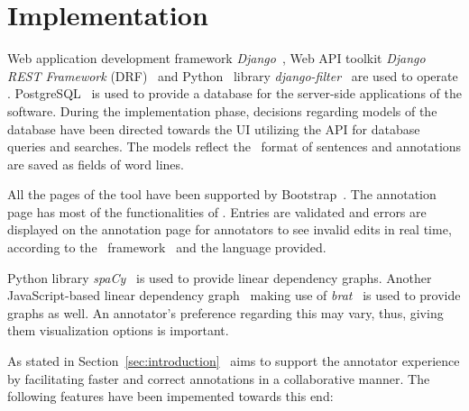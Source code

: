 \section{Implementation}
\label{sec:implementation}

Web application development framework \textit{Django}~\cite{django}, Web API toolkit \textit{Django REST Framework} (DRF)~\cite{drf} and Python~\cite{python} library \textit{django-filter}~\cite{django-filter} are used to operate \boatvtwo.
PostgreSQL~\cite{psql} is used to provide a database for the server-side applications of the software.
During the implementation phase, decisions regarding models of the database have been directed towards the UI utilizing the API for database queries and searches.
The models reflect the \ud\ format of sentences and annotations are saved as fields of word lines.

All the pages of the tool have been supported by Bootstrap~\cite{bootstrap}.
The annotation page has most of the functionalities of \boatvone.
Entries are validated and errors are displayed on the annotation page for annotators to see invalid edits in real time, according to the \ud\ framework~\cite{UD} and the language provided.

Python library \textit{spa\textsc{C}y}~\cite{spacy} is used to provide linear dependency graphs.
Another JavaScript-based linear dependency graph~\cite{spyssalo} making use of \textit{brat}~\cite{brat} is used to provide graphs as well.
An annotator's preference regarding this may vary, thus, giving them visualization options is important.




As stated in Section~\ref{sec:introduction} \boatvtwo\ aims to support the annotator experience by facilitating faster and correct annotations in a collaborative manner. The following features have been impemented towards this end:

